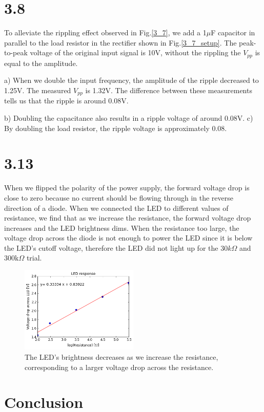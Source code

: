 \documentclass[authoryear, 12pt,5p, times]{elsarticle}
\begin{document}
\section*{3.8}
To alleviate the rippling effect observed in Fig.\ref{3_7}, we add a 1$\mu$F capacitor in parallel to the load resistor in the rectifier shown in Fig.\ref{3_7_setup}. The peak-to-peak voltage of the original input signal  is 10V, without the rippling the $V_{pp}$ is equal to the amplitude.
\par a) When we double the input frequency, the amplitude of the ripple  decreased to 1.25V. The measured $V_{pp}$ is 1.32V. The difference between these measurements tells us that the ripple is around 0.08V.  
\par  b) Doubling the capacitance also results in a ripple voltage of around 0.08V.
c) By doubling the load resistor, the ripple  voltage is approximately 0.08.
\section*{3.13}
When we flipped the polarity of the power supply, the forward voltage drop is close to zero because no current should be flowing through in the reverse direction of a diode. When we connected the LED to different values of resistance, we find that as we increase the resistance, the forward voltage drop increases and the LED brightness dims. When the resistance too large, the voltage drop across the diode is not enough to power the LED since it is below the LED's cutoff voltage, therefore the LED did not light up for the $30k\Omega$ and 300k$\Omega$ trial.
\begin{figure}[h!]
\center
\includegraphics[width=0.5\textwidth]{figure/3_13_LED}
\caption{The LED's brightness decreases as we increase the resistance, corresponding to a larger voltage drop across the resistance.}
\label{3_13_LED}
\end{figure}
\section{Conclusion}
\end{document}
